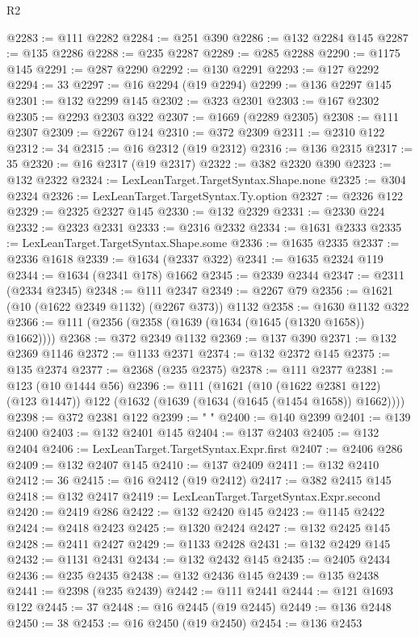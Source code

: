 \begin{lexlean}{R2}
\begin{coremodule}
@2283 := @111 @2282
@2284 := @251 @390
@2286 := @132 @2284 @145
@2287 := @135 @2286
@2288 := @235 @2287
@2289 := @285 @2288
@2290 := @1175 @145
@2291 := @287 @2290
@2292 := @130 @2291
@2293 := @127 @2292
@2294 := 33
@2297 := @16 @2294 (@19 @2294)
@2299 := @136 @2297 @145
@2301 := @132 @2299 @145
@2302 := @323 @2301
@2303 := @167 @2302
@2305 := @2293 @2303 @322
@2307 := @1669 (@2289 @2305)
@2308 := @111 @2307
@2309 := @2267 @124
@2310 := @372 @2309
@2311 := @2310 @122
@2312 := 34
@2315 := @16 @2312 (@19 @2312)
@2316 := @136 @2315
@2317 := 35
@2320 := @16 @2317 (@19 @2317)
@2322 := @382 @2320 @390
@2323 := @132 @2322
@2324 := LexLeanTarget.TargetSyntax.Shape.none
@2325 := @304 @2324
@2326 := LexLeanTarget.TargetSyntax.Ty.option
@2327 := @2326 @122
@2329 := @2325 @2327 @145
@2330 := @132 @2329
@2331 := @2330 @224
@2332 := @2323 @2331
@2333 := @2316 @2332
@2334 := @1631 @2333
@2335 := LexLeanTarget.TargetSyntax.Shape.some
@2336 := @1635 @2335
@2337 := @2336 @1618
@2339 := @1634 (@2337 @322)
@2341 := @1635 @2324 @119
@2344 := @1634 (@2341 @178) @1662
@2345 := @2339 @2344
@2347 := @2311 (@2334 @2345)
@2348 := @111 @2347
@2349 := @2267 @79
@2356 := @1621 (@10 (@1622 @2349 @1132) (@2267 @373)) @1132
@2358 := @1630 @1132 @322
@2366 := @111 (@2356 (@2358 (@1639 (@1634 (@1645 (@1320 @1658)) @1662))))
@2368 := @372 @2349 @1132
@2369 := @137 @390
@2371 := @132 @2369 @1146
@2372 := @1133 @2371
@2374 := @132 @2372 @145
@2375 := @135 @2374
@2377 := @2368 (@235 @2375)
@2378 := @111 @2377
@2381 := @123 (@10 @1444 @56)
@2396 := @111
    (@1621
      (@10 (@1622 @2381 @122) (@123 @1447))
      @122
      (@1632 (@1639 (@1634 (@1645 (@1454 @1658)) @1662))))
@2398 := @372 @2381 @122
@2399 := "            "
@2400 := @140 @2399
@2401 := @139 @2400
@2403 := @132 @2401 @145
@2404 := @137 @2403
@2405 := @132 @2404
@2406 := LexLeanTarget.TargetSyntax.Expr.first
@2407 := @2406 @286
@2409 := @132 @2407 @145
@2410 := @137 @2409
@2411 := @132 @2410
@2412 := 36
@2415 := @16 @2412 (@19 @2412)
@2417 := @382 @2415 @145
@2418 := @132 @2417
@2419 := LexLeanTarget.TargetSyntax.Expr.second
@2420 := @2419 @286
@2422 := @132 @2420 @145
@2423 := @1145 @2422
@2424 := @2418 @2423
@2425 := @1320 @2424
@2427 := @132 @2425 @145
@2428 := @2411 @2427
@2429 := @1133 @2428
@2431 := @132 @2429 @145
@2432 := @1131 @2431
@2434 := @132 @2432 @145
@2435 := @2405 @2434
@2436 := @235 @2435
@2438 := @132 @2436 @145
@2439 := @135 @2438
@2441 := @2398 (@235 @2439)
@2442 := @111 @2441
@2444 := @121 @1693 @122
@2445 := 37
@2448 := @16 @2445 (@19 @2445)
@2449 := @136 @2448
@2450 := 38
@2453 := @16 @2450 (@19 @2450)
@2454 := @136 @2453

\end{coremodule}
\end{lexlean}

